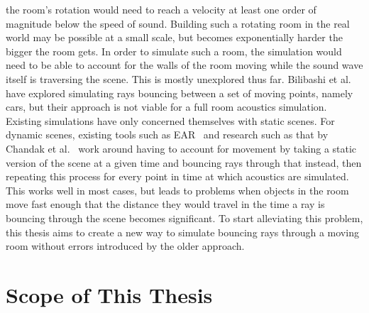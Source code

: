 the room's rotation would need to reach a velocity at least one order of magnitude below the speed of sound.
Building such a rotating room in the real world may be possible at a small scale,
but becomes exponentially harder the bigger the room gets.
\newline
In order to simulate such a room, the simulation would need to be able to account for
the walls of the room moving while the sound wave itself is traversing the scene.
This is mostly unexplored thus far.
Bilibashi et al.~\cite{BVD20} have explored simulating rays bouncing between a set of moving points, namely cars,
but their approach is not viable for a full room acoustics simulation.
\newline
Existing simulations have only concerned themselves with static scenes.
For dynamic scenes, existing tools such as EAR~\cite{Kr17} and research such as that by Chandak et al.~\cite{Cha08}
work around having to account for movement by taking a static version of the scene at a given time
and bouncing rays through that instead,
then repeating this process for every point in time at which acoustics are simulated.
\newline
This works well in most cases, but leads to problems when objects in the room move fast enough
that the distance they would travel in the time a ray is bouncing through the scene becomes significant.
To start alleviating this problem,
this thesis aims to create a new way to simulate bouncing rays through a moving room without errors introduced by the older approach.

\section{Scope of This Thesis}\label{sec:Scope}

